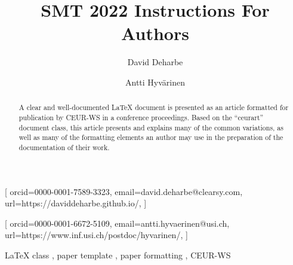 \documentclass{ceurart}
\begin{document}


\title{SMT 2022 Instructions For Authors}

\tnotemark[1]

\author[1]{David Deharbe}[%
orcid=0000-0001-7589-3323,
email=david.deharbe@clearsy.com,
url=https://daviddeharbe.github.io/,
]
\cormark[1]
\fnmark[1]
\address[1]{CLEARSY Safety Solutions,
  Parc de la Duranne, 320 Avenue Archimède, Les Pléiades III Bât A, 13100 Aix-en-Provence, France}

\author[2]{Antti Hyvärinen}[%
orcid=0000-0001-6672-5109,
email=antti.hyvaerinen@usi.ch,
url=https://www.inf.usi.ch/postdoc/hyvarinen/,
]
\fnmark[1]
\address[2]{Universit{\`a} della Svizzera italiana, Via Giuseppe Buffi 13, 6900 Lugano, Switzerland}


\begin{abstract}
  A clear and well-documented \LaTeX{} document is presented as an
  article formatted for publication by CEUR-WS in a conference
  proceedings. Based on the ``ceurart'' document class, this article
  presents and explains many of the common variations, as well as many
  of the formatting elements an author may use in the preparation of
  the documentation of their work.
\end{abstract}

\begin{keywords}
  LaTeX class \sep
  paper template \sep
  paper formatting \sep
  CEUR-WS
\end{keywords}
\end{document}
